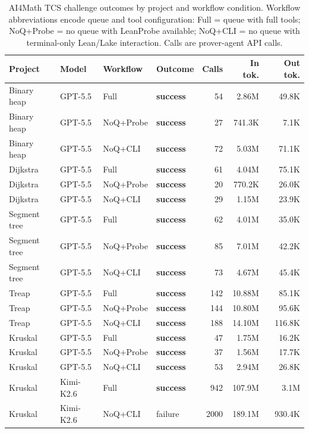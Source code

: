 \documentclass{article}
\newcommand{\kimi}{Kimi-K2.6\xspace}
\newcommand{\gpt}{GPT-5.5\xspace}
\newcommand{\lean}{Lean\xspace}
\begin{document}
\begin{table}[!b]
\centering
\caption{AI4Math TCS challenge outcomes by project and workflow condition. Workflow abbreviations encode queue and tool configuration: Full = queue with full tools; NoQ+Probe = no queue with LeanProbe available; NoQ+CLI = no queue with terminal-only \lean/Lake interaction. Calls are prover-agent API calls.}
\label{tab:proof-experiments}
\footnotesize
\setlength{\tabcolsep}{3pt}
\begin{tabular*}{\textwidth}{@{\extracolsep{\fill}}llllrrr@{}}
\toprule
Project & Model & Workflow & Outcome & Calls & In tok. & Out tok. \\
\midrule
Binary heap & \gpt & Full & \textbf{success} & 54 & 2.86M & 49.8K \\
Binary heap & \gpt & NoQ+Probe & \textbf{success} & 27 & 741.3K & 7.1K \\
Binary heap & \gpt & NoQ+CLI & \textbf{success} & 72 & 5.03M & 71.1K \\
\midrule
Dijkstra & \gpt & Full & \textbf{success} & 61 & 4.04M & 75.1K \\
Dijkstra & \gpt & NoQ+Probe & \textbf{success} & 20 & 770.2K & 26.0K \\
Dijkstra & \gpt & NoQ+CLI & \textbf{success} & 29 & 1.15M & 23.9K \\
\midrule
Segment tree & \gpt & Full & \textbf{success} & 62 & 4.01M & 35.0K \\
Segment tree & \gpt & NoQ+Probe & \textbf{success} & 85 & 7.01M & 42.2K \\
Segment tree & \gpt & NoQ+CLI & \textbf{success} & 73 & 4.67M & 45.4K \\
\midrule
Treap & \gpt & Full & \textbf{success} & 142 & 10.88M & 85.1K \\
Treap & \gpt & NoQ+Probe & \textbf{success} & 144 & 10.80M & 95.6K \\
Treap & \gpt & NoQ+CLI & \textbf{success} & 188 & 14.10M & 116.8K \\
\midrule
Kruskal & \gpt & Full & \textbf{success} & 47 & 1.75M & 16.2K \\
Kruskal & \gpt & NoQ+Probe & \textbf{success} & 37 & 1.56M & 17.7K \\
Kruskal & \gpt & NoQ+CLI & \textbf{success} & 53 & 2.94M & 26.8K \\
\midrule
Kruskal & \kimi & Full & \textbf{success} & 942 & 107.9M & 3.1M \\
Kruskal & \kimi & NoQ+CLI & failure & 2000 & 189.1M & 930.4K \\
\bottomrule
\end{tabular*}
\end{table}
\end{document}
